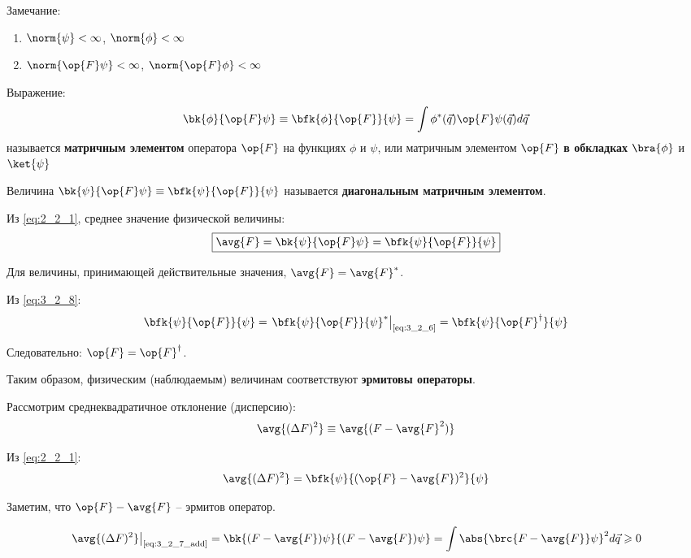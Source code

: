 Замечание:
\begin{enumerate}
\item $\norm{\psi} < \infty$, $\norm{\phi} < \infty$
\item $\norm{\op{F} \psi} < \infty$, $\norm{\op{F} \phi} < \infty$
\end{enumerate}

\begin{defn}
Выражение:
$$
\bk{\phi}{\op{F}\psi} \equiv \bfk{\phi}{\op{F}}{\psi} = \int \phi^*(\vec{q})\op{F}\psi(\vec{q}) d\vec{q}
$$
называется \textbf{матричным элементом} оператора $\op{F}$ на функциях $\phi$ и $\psi$, или матричным элементом $\op{F}$ \textbf{в обкладках} $\bra{\phi}$ и $\ket{\psi}$  

Величина $\bk{\psi}{\op{F}\psi} \equiv \bfk{\psi}{\op{F}}{\psi}$ называется \textbf{диагональным матричным элементом}.
\end{defn}

Из \eqref{eq:2_2_1}, среднее значение физической величины:
\begin{equation}
\label{eq:3_2_8}
\boxed {
	\avg{F} = \bk{\psi}{\op{F}\psi} = \bfk{\psi}{\op{F}}{\psi}
}
\end{equation}

Для величины, принимающей действительные значения, $\avg{F} = \avg{F}^*$.

Из \eqref{eq:3_2_8}:
\begin{equation}
\label{eq:3_2_9}
\bfk{\psi}{\op{F}}{\psi} = \left .\bfk{\psi}{\op{F}}{\psi}^* \right|_{\text{\eqref{eq:3_2_6}}} = \bfk{\psi}{\op{F}^\dag}{\psi}
\end{equation}

Следовательно: $\op{F} = \op{F}^\dag$.

Таким образом, физическим (наблюдаемым) величинам соответствуют \textbf{эрмитовы операторы}.

Рассмотрим среднеквадратичное отклонение (дисперсию):
\begin{equation}
\label{eq:3_2_10}
\avg{(\Delta F)^2} \equiv \avg{(F - \avg{F}^2)}
\end{equation}

Из \eqref{eq:2_2_1}:
\begin{equation}
\label{eq:3_2_11}
\avg{(\Delta F)^2} = \bfk{\psi}{(\op{F} - \avg{F})^2}{\psi}
\end{equation}

Заметим, что $\op{F} - \avg{F}$ -- эрмитов оператор.

\begin{equation}
\label{eq:3_2_12}
\left. \avg{(\Delta F)^2} \right|_{\text{\eqref{eq:3_2_7_add}}} = \bk{(F - \avg{F})\psi}{(F - \avg{F})\psi} = \int \abs{\brc{F - \avg{F}}\psi}^2 d\vec{q} \geqslant 0
\end{equation}

